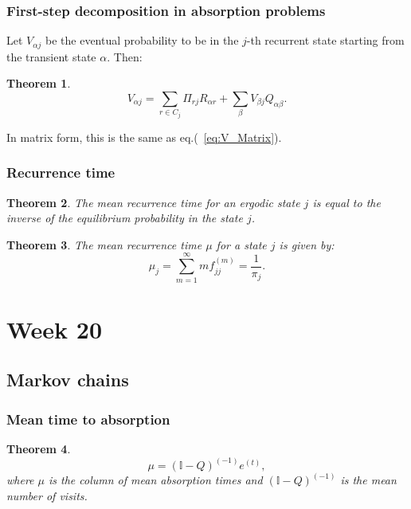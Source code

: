 \documentclass{article}
\newtheorem{theorem}{Theorem}
\begin{document}
\subsubsection{First-step decomposition in absorption problems}
Let $V_{\alpha j}$ be the eventual probability to be in the $j$-th recurrent state starting from the transient state $\alpha$. Then:
\begin{theorem}
    \begin{equation}
        V_{\alpha j} = \sum_{r\in C_{j}}\Pi_{rj}R_{\alpha r} + \sum_\beta V_{\beta j}Q_{\alpha \beta}.
    \end{equation}
\end{theorem}
In matrix form, this is the same as eq.(~\ref{eq:V_Matrix}).

\subsubsection{Recurrence time}
\begin{theorem}
    The mean recurrence time for an ergodic state $j$ is equal to the inverse of the equilibrium probability in the state $j$.
\end{theorem}
\begin{theorem}
    The mean recurrence time $\mu$ for a state $j$ is given by:
    \begin{equation}
        \mu_j = \sum_{m=1}^\infty mf_{jj}^{(m)} = \frac{1}{\pi_j}.
    \end{equation}
\end{theorem}


\section{Week 20}
\subsection{Markov chains}
\subsubsection{Mean time to absorption}
\begin{theorem}
    \begin{equation}
        \mu = (\mathbb{I}-Q)^(-1)e^{(t)},
    \end{equation}
    where $\mu$ is the column of mean absorption times and $ (\mathbb{I}-Q)^(-1) $ is the mean number of visits.
\end{theorem}
\end{document}

